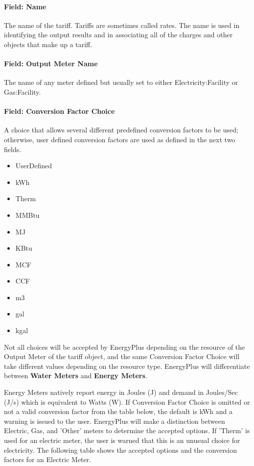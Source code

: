 \paragraph{Field: Name}\label{field-name-064}

The name of the tariff. Tariffs are sometimes called rates. The name is used in identifying the output results and in associating all of the charges and other objects that make up a tariff.

\paragraph{Field: Output Meter Name}\label{field-output-meter-name}

The name of any meter defined but usually set to either Electricity:Facility or Gas:Facility.

\paragraph{Field: Conversion Factor Choice}\label{field-conversion-factor-choice}

A choice that allows several different predefined conversion factors to be used; otherwise, user defined conversion factors are used as defined in the next two fields.

\begin{itemize}
\item
  UserDefined
\item
  kWh
\item
  Therm
\item
  MMBtu
\item
  MJ
\item
  KBtu
\item
  MCF
\item
  CCF
\item
  m3
\item
  gal
\item
  kgal
\end{itemize}

Not all choices will be accepted by EnergyPlus depending on the resource of the Output Meter of the tariff object, and the same Conversion Factor Choice will take different values depending on the resource type. EnergyPlus will differentiate between \textbf{Water Meters} and \textbf{Energy Meters}.

Energy Meters natively report energy in Joules (J) and demand in Joules/Sec (J/s) which is equivalent to Watts (W).
If Conversion Factor Choice is omitted or not a valid conversion factor from the table below, the default is kWh and a warning is issued to the user.
EnergyPlus will make a distinction between Electric, Gas, and 'Other' meters to determine the accepted options. If 'Therm' is used for an electric meter, the user is warned that this is an unusual choice for electricity. The following table shows the accepted options and the conversion factors for an Electric Meter.

